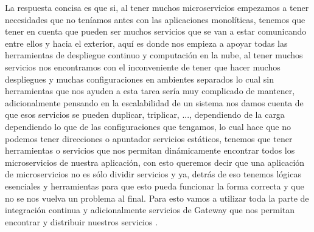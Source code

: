 
La respuesta concisa es que si, al tener muchos microservicios empezamos a tener necesidades que no teníamos antes con las aplicaciones monolíticas, tenemos que tener en cuenta que pueden ser muchos servicios que se van a estar comunicando entre ellos y hacia el exterior, aquí es donde nos empieza a apoyar todas las herramientas de despliegue continuo y computación en la nube, al tener muchos servicios nos encontramos con el inconveniente de tener que hacer muchos despliegues y muchas configuraciones en ambientes separados lo cual sin herramientas que nos ayuden a esta tarea sería muy complicado de mantener, adicionalmente pensando en la escalabilidad de un sistema nos damos cuenta de que esos servicios se pueden duplicar, triplicar, ...,  dependiendo de la carga dependiendo lo que de las configuraciones que tengamos, lo cual hace que no podemos tener direcciones o apuntador servicios estáticos, tenemos que tener herramientas o servicios que nos permitan dinámicamente encontrar todos los microservicios de nuestra aplicación, con esto queremos decir que una aplicación de microservicios no es sólo dividir servicios y ya, detrás de eso tenemos lógicas esenciales y herramientas para que esto pueda funcionar la forma correcta y que no se nos vuelva un problema al final. Para esto vamos a utilizar toda la parte de integración continua y adicionalmente servicios de Gateway que nos permitan encontrar y distribuir nuestros servicios \cite{Dragoni2017}.
